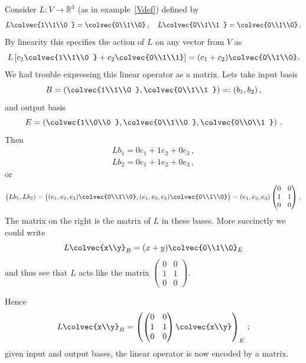 \begin{example}
Consider 
$L:V\to \mathbb{R}^3$ (as in example~\ref{Vdef}) defined by 
\[
L\colvec{1\\1\\0 } = \colvec{0\\1\\0}\, ,\quad
L\colvec{0\\1\\1 } = \colvec{0\\1\\0}\, .
\]
By linearity this specifies the action of $L$ on any vector from $V$ as
\[
L\left[ c_1\colvec{1\\1\\0 } + c_2 \colvec{0\\1\\1} \right]= (c_1+c_2)\colvec{0\\1\\0}.
\]
We had trouble expressing this linear operator as a matrix. Lets take input basis
\[
B=\left(\colvec{1\\1\\0 } ,\colvec{0\\1\\1 }\right)=:(b_1,b_2)\, ,
\]
and output basis 
\[
E=\left(\colvec{1\\0\\0 } ,\colvec{0\\1\\0 } ,\colvec{0\\0\\1 }\right)\, .
\]
Then
\begin{gather*}
L b_1 = 0 e_1 + 1e_2+ 0  e_3 \, ,\\
L b_2 = 0 e_1 + 1e_2+ 0  e_3 \, ,
\end{gather*}
or 
\[
\big(Lb_1, L b_2) = \big( (e_1,e_2,e_3)\colvec{0\\1\\0}, (e_1,e_2,e_3)\colvec{0\\1\\0}\big)=(e_1,e_2,e_3)\begin{pmatrix}0&0\\1&1\\0&0
\end{pmatrix}\, .
\]
The matrix on the right is the matrix of $L$ in these bases.
More succinctly we could write
\[
L\colvec{x\\y}_B=(x+y) \colvec{0\\1\\0}_E
\]
and thus see that $L$ acts like the matrix 
$
\begin{pmatrix}
0&0\\
1&1\\
0&0
\end{pmatrix}
$.

Hence
\[L\colvec{x\\y}_B
=\left(  \begin{pmatrix}
0&0\\
1&1\\
0&0
\end{pmatrix}
\colvec{x\\y} \right)_E\, ;
\]
given input and output bases, the linear operator is now encoded by a matrix.
\end{example}
